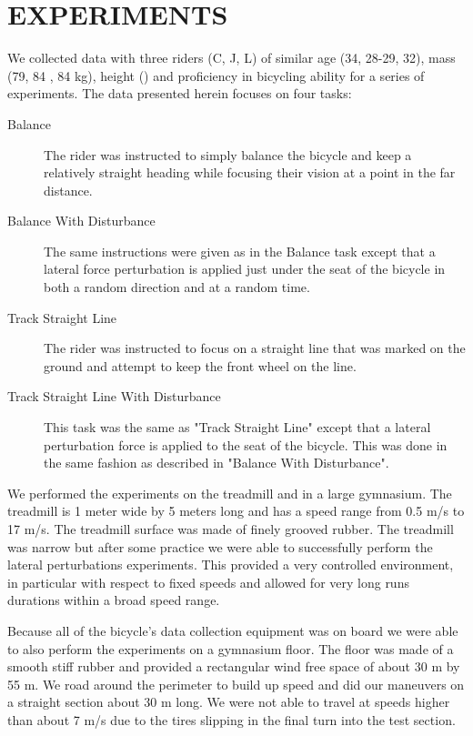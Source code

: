 \documentclass[twocolumn,10pt]{asme2e}
\begin{document}
\section*{EXPERIMENTS}
We collected data with three riders (C, J, L) of similar age (34, 28-29, 32),
mass (79, 84 , 84 kg), height () and proficiency in bicycling ability for a
series of experiments. The data presented herein focuses on four tasks:

\begin{description}
	\item[Balance]
		The rider was instructed to simply balance the bicycle and keep a
		relatively straight heading while focusing their vision at a point in the
		far distance.
	\item[Balance With Disturbance]
		The same instructions were given as in the Balance task except that a
		lateral force perturbation is applied just under the seat of the bicycle in
		both a random direction and at a random time.
	\item[Track Straight Line]
		The rider was instructed to focus on a straight line that was marked on the
		ground and attempt to keep the front wheel on the line.
	\item[Track Straight Line With Disturbance]
		This task was the same as "Track Straight Line" except that a lateral
		perturbation force is applied to the seat of the bicycle. This was done in
		the same fashion as described in "Balance With Disturbance".
\end{description}

We performed the experiments on the treadmill and in a large gymnasium. The
treadmill is 1 meter wide by 5 meters long and has a speed range from 0.5 m/s
to 17 m/s. The treadmill surface was made of finely grooved rubber. The
treadmill was narrow but after some practice we were able to successfully
perform the lateral perturbations experiments. This provided a very controlled
environment, in particular with respect to fixed speeds and allowed for very
long runs durations within a broad speed range.

Because all of the bicycle's data collection equipment was on board we were
able to also perform the experiments on a gymnasium floor. The floor was made
of a smooth stiff rubber and provided a rectangular wind free space of about 30
m by 55 m. We road around the perimeter to build up speed and did our maneuvers
on a straight section about 30 m long. We were not able to travel at speeds
higher than about 7 m/s due to the tires slipping in the final turn into the
test section.
\end{document}
